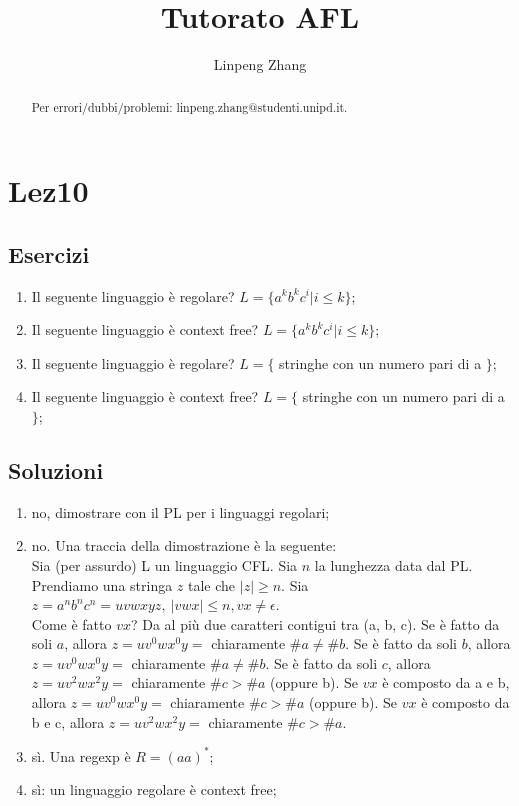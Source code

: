 \documentclass[a4paper,11pt]{article}
\begin{document}
\author{Linpeng Zhang}
\title{Tutorato AFL}
\maketitle
\begin{abstract}
    Per errori/dubbi/problemi: linpeng.zhang@studenti.unipd.it.
\end{abstract}
\tableofcontents
\section{Lez10}
\subsection{Esercizi}
\begin{enumerate}
    \item  Il seguente linguaggio è regolare? $L =\{ a^k b^k c^i | i\leq k\}$;
    \item  Il seguente linguaggio è context free? $L =\{ a^k b^k c^i | i\leq k\}$;
    \item  Il seguente linguaggio è regolare? $L =\{$ stringhe con un numero pari di a $\}$;
    \item  Il seguente linguaggio è context free? $L =\{$ stringhe con un numero pari di a $\}$;
\end{enumerate}
\subsection{Soluzioni}
\begin{enumerate}
    \item no, dimostrare con il PL per i linguaggi regolari;
    \item no. Una traccia della dimostrazione è la seguente:\\
    Sia (per assurdo) L un linguaggio CFL. Sia $n$ la lunghezza data dal PL. Prendiamo una stringa $z$ tale che $|z| \geq n$.
    Sia $z=a^nb^nc^n= uvwxyz, \ |vwx| \leq n, vx \neq \epsilon$.\\
    Come è fatto $vx$? Da al più due caratteri contigui tra (a, b, c).
    Se è fatto da soli $a$, allora $z=uv^0wx^0y=$ chiaramente $\#a\neq \#b$.
    Se è fatto da soli $b$, allora $z=uv^0wx^0y=$ chiaramente $\#a\neq \#b$.
    Se è fatto da soli $c$, allora $z=uv^2wx^2y=$ chiaramente $\#c > \#a$ (oppure b).
    Se $vx$ è composto da a e b, allora $z=uv^0wx^0y=$ chiaramente $\#c > \#a$ (oppure b).
    Se $vx$ è composto da b e c, allora $z=uv^2wx^2y=$ chiaramente $\#c > \#a$.
    \item sì. Una regexp è $R=(aa)^{*}$;
    \item sì: un linguaggio regolare è context free;
\end{enumerate}
\end{document}
